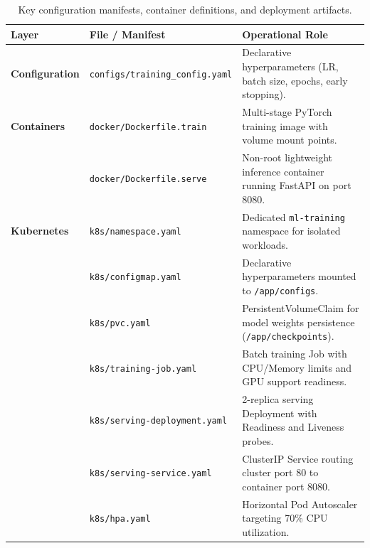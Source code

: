 \documentclass[10pt,a4paper]{article}
\begin{document}
\begin{table}[H]
\centering
\small
\begin{tabularx}{\textwidth}{@{} l l X @{}}
\toprule
\textbf{Layer} & \textbf{File / Manifest} & \textbf{Operational Role} \\
\midrule
\textbf{Configuration} & \texttt{configs/training\_config.yaml} & Declarative hyperparameters (LR, batch size, epochs, early stopping). \\
\addlinespace[1.5pt]
\textbf{Containers} & \texttt{docker/Dockerfile.train} & Multi-stage PyTorch training image with volume mount points. \\
& \texttt{docker/Dockerfile.serve} & Non-root lightweight inference container running FastAPI on port 8080. \\
\addlinespace[1.5pt]
\textbf{Kubernetes} & \texttt{k8s/namespace.yaml} & Dedicated \texttt{ml-training} namespace for isolated workloads. \\
& \texttt{k8s/configmap.yaml} & Declarative hyperparameters mounted to \texttt{/app/configs}. \\
& \texttt{k8s/pvc.yaml} & PersistentVolumeClaim for model weights persistence (\texttt{/app/checkpoints}). \\
& \texttt{k8s/training-job.yaml} & Batch training Job with CPU/Memory limits and GPU support readiness. \\
& \texttt{k8s/serving-deployment.yaml} & 2-replica serving Deployment with Readiness and Liveness probes. \\
& \texttt{k8s/serving-service.yaml} & ClusterIP Service routing cluster port 80 to container port 8080. \\
& \texttt{k8s/hpa.yaml} & Horizontal Pod Autoscaler targeting 70\% CPU utilization. \\
\bottomrule
\end{tabularx}
\caption{Key configuration manifests, container definitions, and deployment artifacts.}
\label{tab:manifests}
\end{table}
\end{document}
